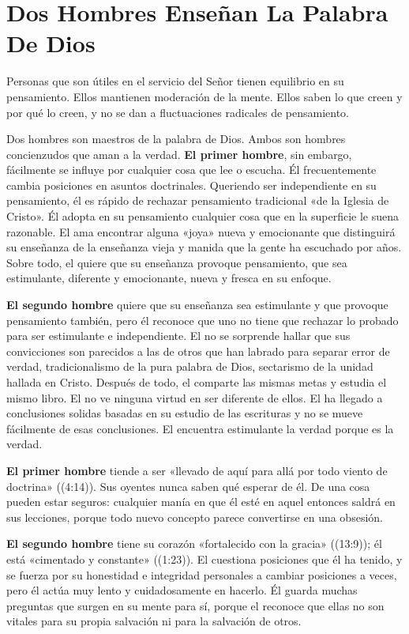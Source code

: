 \documentclass[12pt, twoside, openright]{book}
\begin{document}
\section{Dos Hombres Enseñan La Palabra De Dios}
Personas que son útiles en el servicio del Señor tienen equilibrio en su pensamiento. Ellos mantienen moderación de la mente. Ellos saben lo que creen y por qué lo creen, y no se dan a fluctuaciones radicales de pensamiento. 

Dos hombres son maestros de la palabra de Dios. Ambos son hombres concienzudos que aman a la verdad. \textbf{El primer hombre}, sin embargo, fácilmente se influye por cualquier cosa que lee o escucha. Él frecuentemente cambia posiciones en asuntos doctrinales. Queriendo ser independiente en su pensamiento, él es rápido de rechazar pensamiento tradicional «de la Iglesia de Cristo». Él adopta en su pensamiento cualquier cosa que en la superficie le suena razonable. El ama encontrar alguna «joya» nueva y emocionante que distinguirá su enseñanza de la enseñanza vieja y manida que la gente ha escuchado por años. Sobre todo, el quiere que su enseñanza provoque pensamiento, que sea estimulante, diferente y emocionante, nueva y fresca en su enfoque. 

\textbf{El segundo hombre} quiere que su enseñanza sea estimulante y que provoque pensamiento también, pero él reconoce que uno no tiene que rechazar lo probado para ser estimulante e independiente. El no se sorprende hallar que sus convicciones son parecidos a las de otros que han labrado para separar error de verdad, tradicionalismo de la pura palabra de Dios, sectarismo de la unidad hallada en Cristo. Después de todo, el comparte las mismas metas y estudia el mismo libro. El no ve ninguna virtud en ser diferente de ellos. El ha llegado a conclusiones solidas basadas en su estudio de las escrituras y no se mueve fácilmente de esas conclusiones. El encuentra estimulante la verdad porque es la verdad. 

\textbf{El primer hombre} tiende a ser «llevado de aquí para allá por todo viento de doctrina» ((4:14)). Sus oyentes nunca saben qué esperar de él. De una cosa pueden estar seguros: cualquier manía en que él esté en aquel entonces saldrá en sus lecciones, porque todo nuevo concepto parece convertirse en una obsesión. 

\textbf{El segundo hombre} tiene su corazón «fortalecido con la gracia» ((13:9)); él está «cimentado y constante» ((1:23)). El cuestiona posiciones que él ha tenido, y se fuerza por su honestidad e integridad personales a cambiar posiciones a veces, pero él actúa muy lento y cuidadosamente en hacerlo. Él guarda muchas preguntas que surgen en su mente para sí, porque el reconoce que ellas no son vitales para su propia salvación ni para la salvación de otros. 
\end{document}
